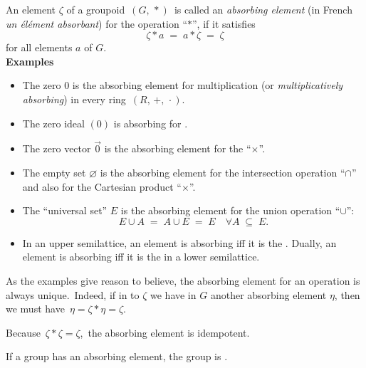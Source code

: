 \documentclass[12pt]{article}
\theoremstyle{definition}
\begin{document}
An element $\zeta$ of a groupoid\, $(G,\,*)$\, is called an {\em absorbing element} (in French {\em un \'el\'ement absorbant}) for the operation ``$*$'', if it satisfies
    $$\zeta\!*\!a \;=\; a\!*\!\zeta \;=\; \zeta$$
for all elements $a$ of $G$.\\

\textbf{Examples}
\begin{itemize}
 \item The zero $0$ is the absorbing element for multiplication (or {\em multiplicatively absorbing}) in every ring\, $(R,\,+,\,\cdot)$.
 \item The zero ideal $(0)$ is absorbing for .
 \item The zero vector $\vec{0}$ is the absorbing element for the  ``$\times$''.
 \item The empty set $\varnothing$ is the absorbing element for the  intersection operation ``$\cap$'' and also for the Cartesian product ``$\times$''.
 \item The ``universal set'' $E$ is the absorbing element for the union operation ``$\cup$'':
             $$E\!\cup\!A \;=\; A\!\cup\!E \;=\; E \quad \forall A \;\subseteq\; E.$$
 \item In an upper semilattice, an element is absorbing iff it is the .  Dually, an element is absorbing iff it is the  in a lower semilattice.
\end{itemize} 

As the examples give reason to believe, the absorbing element for an operation is always unique.\, Indeed, if in  to $\zeta$ we have in $G$ another absorbing element $\eta$, then we must have\, $\eta = \zeta\!*\!\eta = \zeta$.

Because\, $\zeta\!*\!\zeta = \zeta$,\, the absorbing element is idempotent.

If a group has an absorbing element, the group is .
\end{document}
